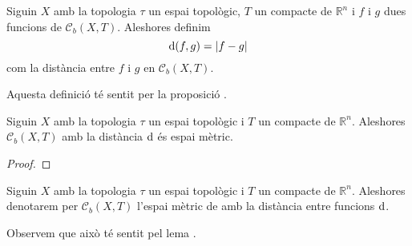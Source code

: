 \documentclass[../Apunts.tex]{subfiles}
\begin{document}
	\begin{definition}
		\label{def:distància entre funcions acotades}
		Siguin \(X\) amb la topologia \(\tau\) un espai topològic, \(T\) un compacte de \(\mathbb{R}^{n}\) i \(f\) i \(g\) dues funcions de \(\mathcal{C}_{b}(X,T)\). Aleshores definim
		\[\distancia(f,g)=\norm{f-g}\]
		com la distància entre \(f\) i \(g\) en \(\mathcal{C}_{b}(X,T)\).
		
		Aquesta definició té sentit per la proposició .
	\end{definition}
	\begin{lemma}
		\label{thm:l'espai de funcions contínues i acotades és un espai mètric}
		Siguin \(X\) amb la topologia \(\tau\) un espai topològic i \(T\) un compacte de \(\mathbb{R}^{n}\). Aleshores \(\mathcal{C}_{b}(X,T)\) amb la distància \(\operatorname{d}\) és espai mètric.
		\begin{proof}
		\end{proof}
	\end{lemma}
	\begin{notation}
		Siguin \(X\) amb la topologia \(\tau\) un espai topològic i \(T\) un compacte de \(\mathbb{R}^{n}\). Aleshores denotarem per \(\mathcal{C}_{b}(X,T)\) l'espai mètric de amb la distància entre funcions \(\operatorname{d}\).
		
		Observem que això té sentit pel lema .
	\end{notation}
\end{document}
